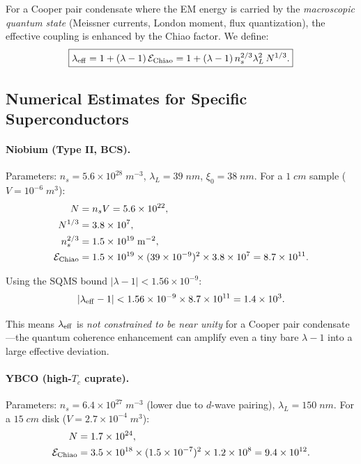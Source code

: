 \documentclass[aps,prd,twocolumn,superscriptaddress,floatfix,nofootinbib]{revtex4-2}
\newcommand{\lam}{\lambda}
\begin{document}
For a Cooper pair condensate where the EM energy is carried by the
\emph{macroscopic quantum state} (Meissner currents, London moment,
flux quantization), the effective coupling is enhanced by the Chiao
factor. We define:
\begin{equation}
\boxed{
\lam_{\rm eff} = 1 + (\lam - 1)\,\mathcal{E}_{\rm Chiao}
= 1 + (\lam - 1)\,n_s^{2/3}\lambda_L^2\,N^{1/3}.
}
\label{eq:lambda-eff}
\end{equation}

\subsection{Numerical Estimates for Specific Superconductors}
\label{sec:numerical-estimates}

\paragraph{Niobium (Type II, BCS).}
Parameters: $n_s = 5.6 \times 10^{28}\;\si{m^{-3}}$,
$\lambda_L = 39\;\si{nm}$, $\xi_0 = 38\;\si{nm}$.
For a $1\;\si{cm}$ sample ($V = 10^{-6}\;\si{m^3}$):
\begin{align}
N &= n_s V = 5.6 \times 10^{22}, \\
N^{1/3} &= 3.8 \times 10^{7}, \\
n_s^{2/3} &= 1.5 \times 10^{19}\;\si{m^{-2}}, \\
\mathcal{E}_{\rm Chiao} &= 1.5 \times 10^{19}
\times (39 \times 10^{-9})^2 \times 3.8 \times 10^{7}
= 8.7 \times 10^{11}.
\end{align}

Using the SQMS bound $|\lam - 1| < 1.56 \times 10^{-9}$:
\begin{equation}
|\lam_{\rm eff} - 1| < 1.56 \times 10^{-9} \times 8.7 \times 10^{11}
= 1.4 \times 10^{3}.
\end{equation}

This means $\lam_{\rm eff}$ is \emph{not constrained to be near unity}
for a Cooper pair condensate---the quantum coherence enhancement can
amplify even a tiny bare $\lam - 1$ into a large effective
deviation.

\paragraph{YBCO (high-$T_c$ cuprate).}
Parameters: $n_s = 6.4 \times 10^{27}\;\si{m^{-3}}$ (lower due to
$d$-wave pairing), $\lambda_L = 150\;\si{nm}$.
For a $15\;\si{cm}$ disk ($V = 2.7 \times 10^{-4}\;\si{m^3}$):
\begin{align}
N &= 1.7 \times 10^{24}, \\
\mathcal{E}_{\rm Chiao} &= 3.5 \times 10^{18}
\times (1.5 \times 10^{-7})^2 \times 1.2 \times 10^{8}
= 9.4 \times 10^{12}.
\end{align}
\end{document}
